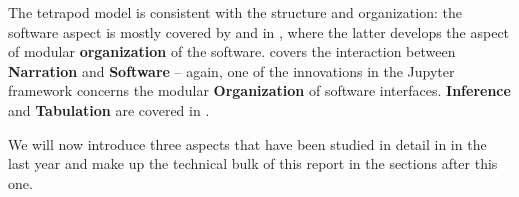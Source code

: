 The tetrapod model is consistent with the \pn structure and organization: the software aspect is mostly covered by  and  in \pn, where the latter develops the aspect of modular \textbf{organization} of the software.  covers the interaction between \textbf{Narration} and \textbf{Software} -- again, one of the innovations in the Jupyter framework concerns the modular \textbf{Organization} of software interfaces. \textbf{Inference} and \textbf{Tabulation} are covered in .

We will now introduce three aspects that have been studied in detail in \pn in the last year and make up the technical bulk of this report in the sections after this one.  


